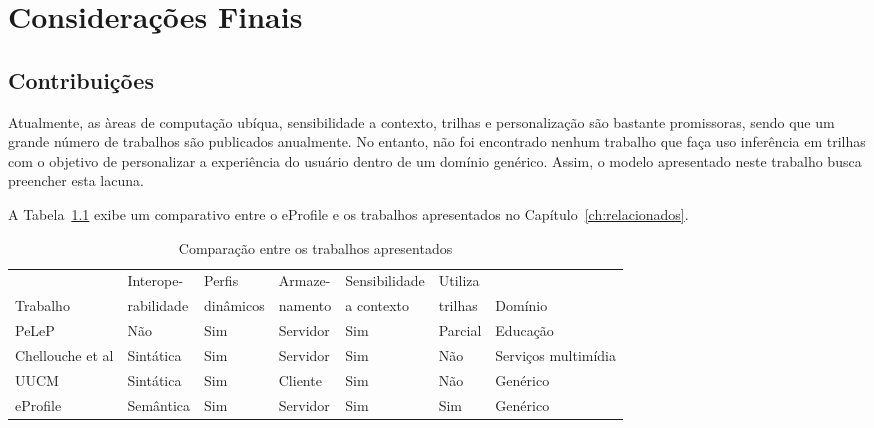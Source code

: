 \chapter{Considerações Finais}
\label{ch:consideracoes}


\section{Contribuições}
\label{sec:contribuicoes}

Atualmente, as àreas de computação ubíqua, sensibilidade a contexto, trilhas e personalização são bastante promissoras, sendo que um grande número de trabalhos são publicados anualmente. No entanto, não foi encontrado nenhum trabalho que faça uso inferência em trilhas com o objetivo de personalizar a experiência do usuário dentro de um domínio genérico. Assim, o modelo apresentado neste trabalho busca preencher esta lacuna. 

A Tabela~\ref{tab:comparacao2} exibe um comparativo entre o eProfile e os trabalhos apresentados no Capítulo~\ref{ch:relacionados}.

\begin{table}\centering\footnotesize
  \begin{tabular*}{1\textwidth}{@{}lllllll@{}}
    \toprule
                                         & Interope-  & Perfis    & Armaze-  & Sensibilidade & Utiliza & \\
    Trabalho                             & rabilidade & dinâmicos & namento  & a contexto    & trilhas & Domínio \\
    \midrule
    PeLeP                                & Não        & Sim       & Servidor & Sim           & Parcial & Educação \\
    Chellouche et al                     & Sintática  & Sim       & Servidor & Sim           & Não     & Serviços multimídia \\
    UUCM                                 & Sintática  & Sim       & Cliente  & Sim           & Não     & Genérico \\
    eProfile                             & Semântica  & Sim       & Servidor & Sim           & Sim     & Genérico \\
    \bottomrule
  \end{tabular*}
  \caption{Comparação entre os trabalhos apresentados}
  \label{tab:comparacao2}
\end{table}

